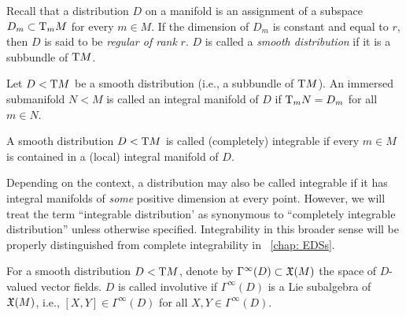 Recall that a distribution $D$ on a manifold is an assignment of a subspace $D_m\subset \mathrm{T}_m M$ for every $m\in M$. If the dimension of $D_m$ is constant and equal to $r$, then $D$ is said to be \emph{regular of rank} $r$. $D$ is called a \emph{smooth distribution} if it is a subbundle of $\mathrm{T} M$.

\begin{defn}
    Let $D< \mathrm{T} M$ be a smooth distribution (i.e., a subbundle of $\mathrm{T} M$). An immersed submanifold $N<M$ is called an integral manifold of $D$ if $\mathrm{T}_m N=D_m$ for all $m\in N$.
\end{defn}

\begin{defn}
    A smooth distribution $D< \mathrm{T} M$ is called (completely) integrable if every $m\in M$ is contained in a (local) integral manifold of $D$.
\end{defn}

\begin{rem}
    Depending on the context, a distribution may also be called integrable if it has integral manifolds of \emph{some} positive dimension at every point. However, we will treat the term ``integrable distribution' as synonymous to ``completely integrable distribution'' unless otherwise specified. Integrability in this broader sense will be properly distinguished from complete integrability in \Chap~\ref{chap: EDSs}.
\end{rem}

\begin{defn}
    For a smooth distribution $D< \mathrm{T} M$, denote by $\Gamma^\infty(D)\subset\mathfrak{X}(M)$ the space of $D$-valued vector fields. $D$ is called involutive if $\Gamma^\infty(D)$ is a Lie subalgebra of $\mathfrak{X}(M)$, i.e., $[X,Y]\in\Gamma^\infty(D)$ for all $X,Y\in\Gamma^\infty(D)$.
\end{defn}

